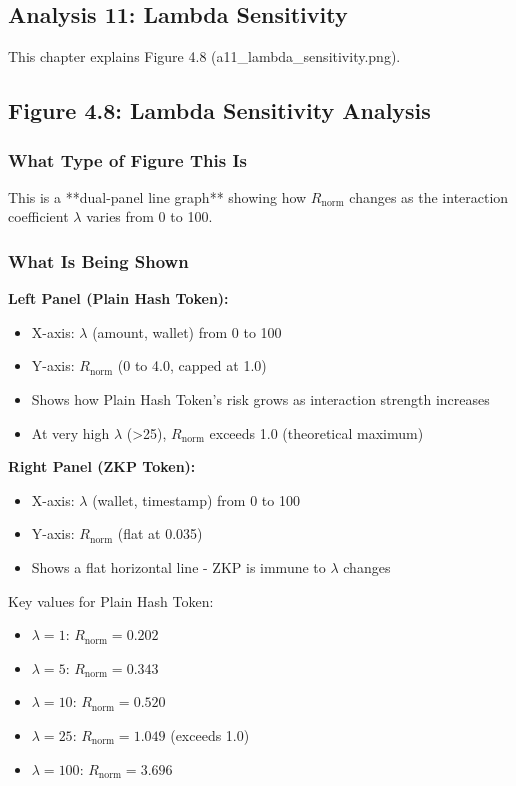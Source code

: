\documentclass[12pt,a4paper,oneside,openany]{report}
\begin{document}
\begin{enumerate}
\chapter{Analysis 11: Lambda Sensitivity}
\label{chap:a11}

This chapter explains Figure 4.8 (a11\_lambda\_sensitivity.png).

\section{Figure 4.8: Lambda Sensitivity Analysis}
\label{sec:f4.8}

\subsection{What Type of Figure This Is}
This is a **dual-panel line graph** showing how $R_{\mathrm{norm}}$ changes as the interaction coefficient $\lambda$ varies from 0 to 100.

\subsection{What Is Being Shown}

\textbf{Left Panel (Plain Hash Token):}
\begin{itemize}
    \item X-axis: $\lambda$ (amount, wallet) from 0 to 100
    \item Y-axis: $R_{\mathrm{norm}}$ (0 to 4.0, capped at 1.0)
    \item Shows how Plain Hash Token's risk grows as interaction strength increases
    \item At very high $\lambda$ (>25), $R_{\mathrm{norm}}$ exceeds 1.0 (theoretical maximum)
\end{itemize}

\textbf{Right Panel (ZKP Token):}
\begin{itemize}
    \item X-axis: $\lambda$ (wallet, timestamp) from 0 to 100
    \item Y-axis: $R_{\mathrm{norm}}$ (flat at 0.035)
    \item Shows a flat horizontal line - ZKP is immune to $\lambda$ changes
\end{itemize}

Key values for Plain Hash Token:
\begin{itemize}
    \item $\lambda=1$: $R_{\mathrm{norm}}=0.202$
    \item $\lambda=5$: $R_{\mathrm{norm}}=0.343$
    \item $\lambda=10$: $R_{\mathrm{norm}}=0.520$
    \item $\lambda=25$: $R_{\mathrm{norm}}=1.049$ (exceeds 1.0)
    \item $\lambda=100$: $R_{\mathrm{norm}}=3.696$
\end{itemize}


\end{enumerate}
\end{document}
